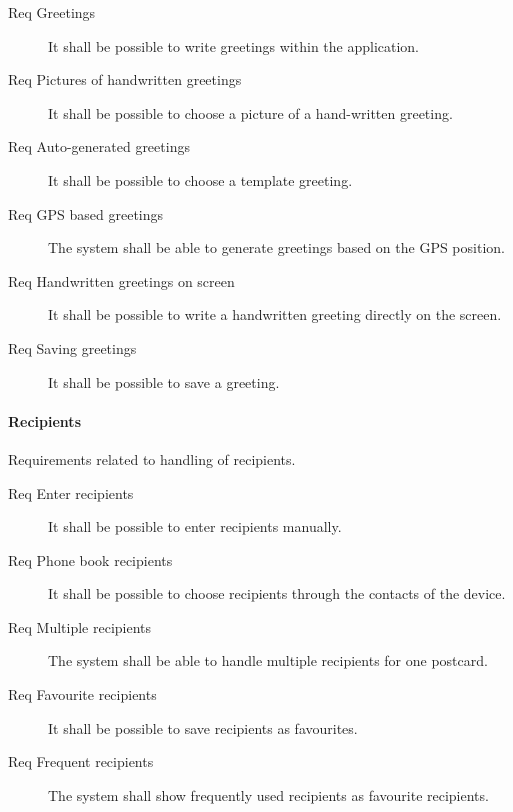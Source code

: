 \documentclass[10pt,a4paper]{article}
\begin{document}
\begin{description}
	\item [Req  Greetings] It shall be possible to write greetings within the application.
	\item [Req  Pictures of handwritten greetings] It shall be possible to choose a picture of a hand-written greeting.
	\item [Req  Auto-generated greetings] It shall be possible to choose a template greeting.
	\item [Req  GPS based greetings] The system shall be able to generate greetings based on the GPS position.
	\item [Req  Handwritten greetings on screen] It shall be possible to write a handwritten greeting directly on the screen.
	\item [Req  Saving greetings] It shall be possible to save a greeting.
\end{description}

\paragraph{Recipients}
Requirements related to handling of recipients.

\begin{description}
	\item [Req  Enter recipients] It shall be possible to enter recipients manually.
	\item [Req  Phone book recipients] It shall be possible to choose recipients through the contacts of the device.
	\item [Req  Multiple recipients] The system shall be able to handle multiple recipients for one postcard.
	\item [Req  Favourite recipients] It shall be possible to save recipients as favourites.
	\item [Req  Frequent recipients] The system shall show frequently used recipients as favourite recipients.
\end{description}
\end{document}
